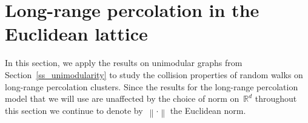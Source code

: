 \documentclass[a4paper,11pt]{article}
\newcommand{\RR}{\mathbb{R}}
\newcommand{\ZZ}{\mathbb{Z}}
\newcommand\norm[1]{\left\lVert#1\right\rVert}
\theoremstyle{definition}
\begin{document}


\section{Long-range percolation in the Euclidean lattice}\label{ss_long_range_perc}
In this section, we apply the results on unimodular graphs from Section~\ref{ss_unimodularity} to study the collision properties of random walks on long-range percolation clusters. Since the results for the long-range percolation model that we will use are unaffected by the choice of norm on~$\RR^d$ throughout this section we continue to denote by~$\norm{ \cdot }$ the Euclidean norm.
\end{document}
